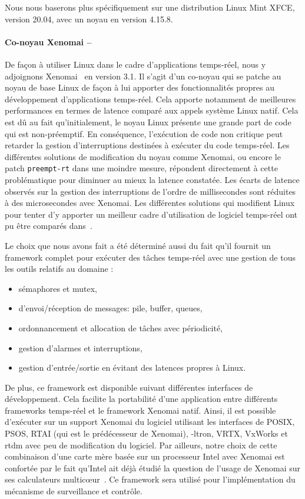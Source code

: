 \documentclass[french, a4paper, 11pt, twoside, pdftex]{StyleThese}
\begin{document}
        Nous nous baserons plus spécifiquement sur une distribution Linux Mint XFCE, version 20.04, avec un noyau en version 4.15.8.
        
        \paragraph{Co-noyau Xenomai --}
        De façon à utiliser Linux dans le cadre d'applications temps-réel, nous y adjoignons Xenomai~\cite{gerum_xenomai_2004} en version 3.1. Il s'agit d'un co-noyau qui se patche au noyau de base Linux de façon à lui apporter des fonctionnalités propres au développement d'applications temps-réel. Cela apporte notamment de meilleures performances en termes de latence comparé aux appels système Linux natif. Cela est dû au fait qu'initialement, le noyau Linux présente une grande part de code qui est non-préemptif. En conséquence, l'exécution de code non critique peut retarder la gestion d'interruptions destinées à exécuter du code temps-réel. Les différentes solutions de modification du noyau comme Xenomai, ou encore le patch \texttt{preempt-rt} dans une moindre mesure, répondent directement à cette problématique pour diminuer au mieux la latence constatée. Les écarts de latence observés sur la gestion des interruptions de l'ordre de millisecondes sont réduites à des microsecondes avec Xenomai. Les différentes solutions qui modifient Linux pour tenter d'y apporter un meilleur cadre d'utilisation de logiciel temps-réel ont pu être comparés dans~\cite{brown_how_2010}. 
        
        Le choix que nous avons fait a été déterminé aussi du fait qu'il fournit un framework complet pour exécuter des tâches temps-réel avec une gestion de tous les outils relatifs au domaine : \begin{itemize}
        	\item sémaphores et mutex,
        	\item d'envoi/réception de messages: pile, buffer, queues,
        	\item ordonnancement et allocation de tâches avec périodicité,
        	\item gestion d'alarmes et interruptions,
        	\item gestion d'entrée/sortie en évitant des latences propres à Linux.\end{itemize}
    	De plus, ce framework est disponible suivant différentes interfaces de développement. Cela facilite la portabilité d'une application entre différents frameworks temps-réel et le framework Xenomai natif. Ainsi, il est possible d'exécuter sur un support Xenomai du logiciel utilisant les interfaces de POSIX, PSOS, RTAI (qui est le prédécesseur de Xenomai), \textmu-ltron, VRTX, VxWorks et rtdm avec peu de modification du logiciel. Par ailleurs, notre choix de cette combinaison d'une carte mère basée sur un processeur Intel avec Xenomai est confortée par le fait qu'Intel ait déjà étudié la question de l'usage de Xenomai sur ses calculateurs multicœur~\cite{intel_corporation_hard_2009}. Ce framework sera utilisé pour l'implémentation du mécanisme de surveillance et contrôle.
    	
\end{document}

